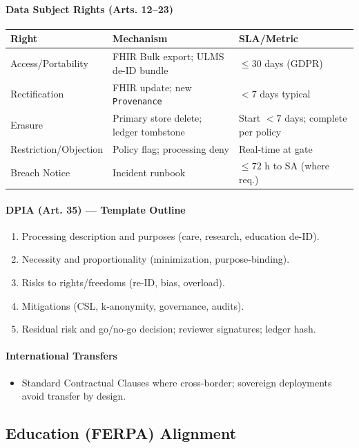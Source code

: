 \documentclass[11pt]{article}
\theoremstyle{plain}
\begin{document}
\paragraph{Data Subject Rights (Arts. 12–23)}
\begin{center}
\begin{tabular}{l l l}
\hline
Right & Mechanism & SLA/Metric \\
\hline
Access/Portability & FHIR Bulk export; ULMS de-ID bundle & $\le 30$ days (GDPR) \\
Rectification & FHIR update; new \texttt{Provenance} & $< 7$ days typical \\
Erasure & Primary store delete; ledger tombstone & Start $< 7$ days; complete per policy \\
Restriction/Objection & Policy flag; processing deny & Real-time at gate \\
Breach Notice & Incident runbook & $\le 72$ h to SA (where req.) \\
\hline
\end{tabular}
\end{center}

\paragraph{DPIA (Art. 35) — Template Outline}
\begin{enumerate}
  \item Processing description and purposes (care, research, education de-ID).
  \item Necessity and proportionality (minimization, purpose-binding).
  \item Risks to rights/freedoms (re-ID, bias, overload).
  \item Mitigations (CSL, k-anonymity, governance, audits).
  \item Residual risk and go/no-go decision; reviewer signatures; ledger hash.
\end{enumerate}

\paragraph{International Transfers}
\begin{itemize}
  \item Standard Contractual Clauses where cross-border; sovereign deployments avoid transfer by design.
\end{itemize}

\subsection{Education (FERPA) Alignment}
\end{document}
